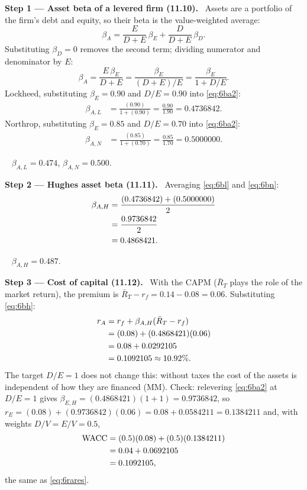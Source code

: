 \documentclass[11pt,a4paper]{article}
\numberwithin{equation}{section}
\newcommand{\step}[2]{\par\medskip\noindent\textbf{Step #1 --- #2.}~}
\newcommand{\answer}[1]{\par\smallskip\noindent\fbox{\textbf{Answer #1.}}~}
\begin{document}
\step{1}{Asset beta of a levered firm (11.10)} Assets are a portfolio of the firm's debt and
equity, so their beta is the value-weighted average:
\begin{equation}\label{eq:6ba}
  \beta_A = \frac{E}{D+E}\,\beta_E + \frac{D}{D+E}\,\beta_D.
\end{equation}
Substituting $\beta_D=0$ removes the second term; dividing numerator and denominator by $E$:
\begin{equation}\label{eq:6ba2}
  \beta_A = \frac{E\,\beta_E}{D+E} = \frac{\beta_E}{(D+E)/E} = \frac{\beta_E}{1+D/E}.
\end{equation}
Lockheed, substituting $\beta_E=0.90$ and $D/E=0.90$ into \eqref{eq:6ba2}:
\begin{align}
  \beta_{A,L} &= \frac{(0.90)}{1+(0.90)} = \frac{0.90}{1.90} = 0.4736842. \label{eq:6bl}
\end{align}
Northrop, substituting $\beta_E=0.85$ and $D/E=0.70$ into \eqref{eq:6ba2}:
\begin{align}
  \beta_{A,N} &= \frac{(0.85)}{1+(0.70)} = \frac{0.85}{1.70} = 0.5000000. \label{eq:6bn}
\end{align}

\answer{(11.10)} $\beta_{A,L}=0.474$, $\beta_{A,N}=0.500$.

\step{2}{Hughes asset beta (11.11)} Averaging \eqref{eq:6bl} and \eqref{eq:6bn}:
\begin{align}
  \beta_{A,H} &= \frac{(0.4736842) + (0.5000000)}{2} \notag\\
              &= \frac{0.9736842}{2} \notag\\
              &= 0.4868421. \label{eq:6bh}
\end{align}

\answer{(11.11)} $\beta_{A,H}=0.487$.

\step{3}{Cost of capital (11.12)} With the CAPM ($\bar R_T$ plays the role of the market return),
the premium is $\bar R_T-r_f=0.14-0.08=0.06$. Substituting \eqref{eq:6bh}:
\begin{align}
  r_A &= r_f + \beta_{A,H}(\bar R_T - r_f) \label{eq:6ra}\\
      &= (0.08) + (0.4868421)(0.06) \notag\\
      &= 0.08 + 0.0292105 \notag\\
      &= 0.1092105 \approx 10.92\%. \label{eq:6rares}
\end{align}
The target $D/E=1$ does not change this: without taxes the cost of the assets is independent of
how they are financed (MM). Check: relevering \eqref{eq:6ba2} at $D/E=1$ gives
$\beta_{E,H}=(0.4868421)(1+1)=0.9736842$, so $r_E=(0.08)+(0.9736842)(0.06)=0.08+0.0584211=0.1384211$
and, with weights $D/V=E/V=0.5$,
\begin{align}
  \mathrm{WACC} &= (0.5)(0.08) + (0.5)(0.1384211) \notag\\
                &= 0.04 + 0.0692105 \notag\\
                &= 0.1092105, \notag
\end{align}
the same as \eqref{eq:6rares}.
\end{document}
